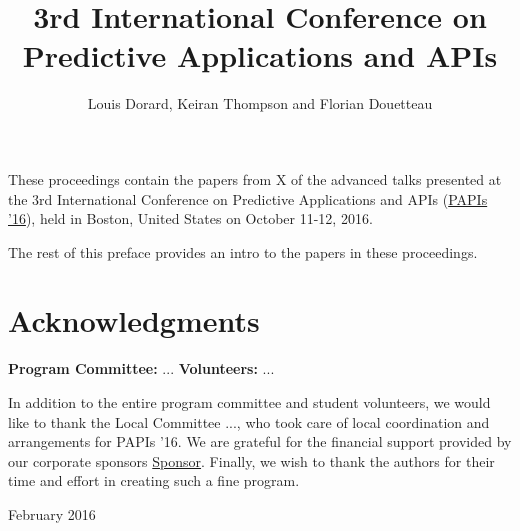 \documentclass[wcp]{jmlrbook}
\title[PAPIs 2016]{3rd International Conference on Predictive Applications and APIs}
\author{Louis Dorard, Keiran Thompson and Florian Douetteau}
\subtitle{\thejmlrworkshop}
\begin{document}
\maketitle

\frontmatter

\begin{preface}

  These proceedings contain the papers from X of the advanced talks presented at the 3rd International Conference on Predictive Applications and APIs (\href{http://papis.io/2016}{PAPIs '16}), held in Boston, United States on October 11-12, 2016.

  The rest of this preface provides an intro to the papers in these proceedings.

  \section*{Acknowledgments}

  \textbf{Program Committee:}
  ...
  \textbf{Volunteers:}
  ...

  In addition to the entire program committee and student volunteers, we would like to thank the Local Committee ..., who took care of local coordination and arrangements for PAPIs '16.
  We are grateful for the financial support provided by our corporate sponsors \href{http://sponsor.com}{Sponsor}.
  Finally, we wish to thank the authors for their time and effort in creating such a fine program.

\begin{signoff}{February 2016}
\end{signoff}


\end{preface}

\tableofcontents

\mainmatter

\begin{jmlrpapers}
\end{jmlrpapers}
\end{document}
